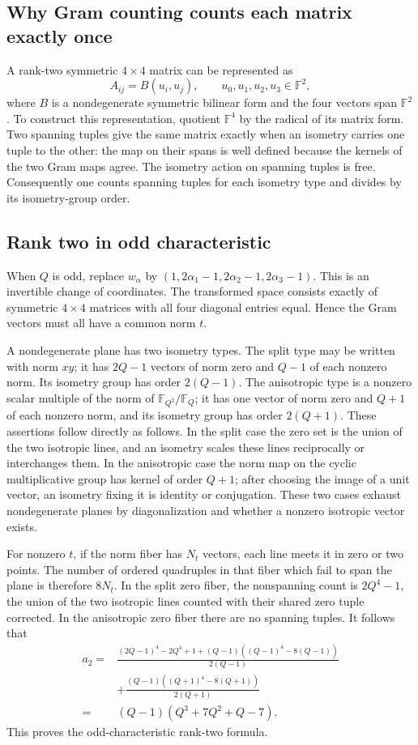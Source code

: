 \documentclass[11pt,a4paper]{article}
\numberwithin{equation}{section}
\theoremstyle{definition}
\theoremstyle{remark}
\newcommand{\F}{\mathbb F}
\newcommand{\1}{\mathbf 1}
\begin{document}
\subsection{Why Gram counting counts each matrix exactly once}
A rank-two symmetric $4\times4$ matrix can be represented as
\[
 A_{ij}=B(u_i,u_j),\qquad u_0,u_1,u_2,u_3\in\F^2,
\]
where $B$ is a nondegenerate symmetric bilinear form and the four vectors
span $\F^2$. To construct this representation, quotient $\F^4$ by the
radical of its matrix form. Two spanning tuples give the same matrix
exactly when an isometry carries one tuple to the other: the map on their
spans is well defined because the kernels of the two Gram maps agree.
The isometry action on spanning tuples is free. Consequently one counts
spanning tuples for each isometry type and divides by its isometry-group
order.

\subsection{Rank two in odd characteristic}
When $Q$ is odd, replace $w_\alpha$ by
$(1,2\alpha_1-1,2\alpha_2-1,2\alpha_3-1)$. This is an invertible change of
coordinates. The transformed space consists exactly of symmetric
$4\times4$ matrices with all four diagonal entries equal. Hence the Gram
vectors must all have a common norm $t$.

A nondegenerate plane has two isometry types. The split type may be written
with norm $xy$; it has $2Q-1$ vectors of norm zero and $Q-1$ of each nonzero
norm. Its isometry group has order $2(Q-1)$. The anisotropic type is a
nonzero scalar multiple of the norm of $\F_{Q^2}/\F_Q$; it has one vector
of norm zero and $Q+1$ of each nonzero norm, and its isometry group has
order $2(Q+1)$. These assertions follow directly as follows. In the split
case the zero set is the union of the two isotropic lines, and an isometry
scales these lines reciprocally or interchanges them. In the anisotropic
case the norm map on the cyclic multiplicative group has kernel of order
$Q+1$; after choosing the image of a unit vector, an isometry fixing it is
identity or conjugation. These two cases exhaust nondegenerate planes by
diagonalization and whether a nonzero isotropic vector exists.

For nonzero $t$, if the norm fiber has $N_t$ vectors, each line meets it
in zero or two points. The number of ordered quadruples in that fiber
which fail to span the plane is therefore $8N_t$. In the split zero
fiber, the nonspanning count is $2Q^4-1$, the union of the two isotropic
lines counted with their shared zero tuple corrected. In the anisotropic
zero fiber there are no spanning tuples. It follows that
\begin{align*}
 a_2={}&\frac{(2Q-1)^4-2Q^4+1+(Q-1)((Q-1)^4-8(Q-1))}{2(Q-1)}\\
 &+\frac{(Q-1)((Q+1)^4-8(Q+1))}{2(Q+1)}\\
 ={}&(Q-1)(Q^3+7Q^2+Q-7).
\end{align*}
This proves the odd-characteristic rank-two formula.
\end{document}
